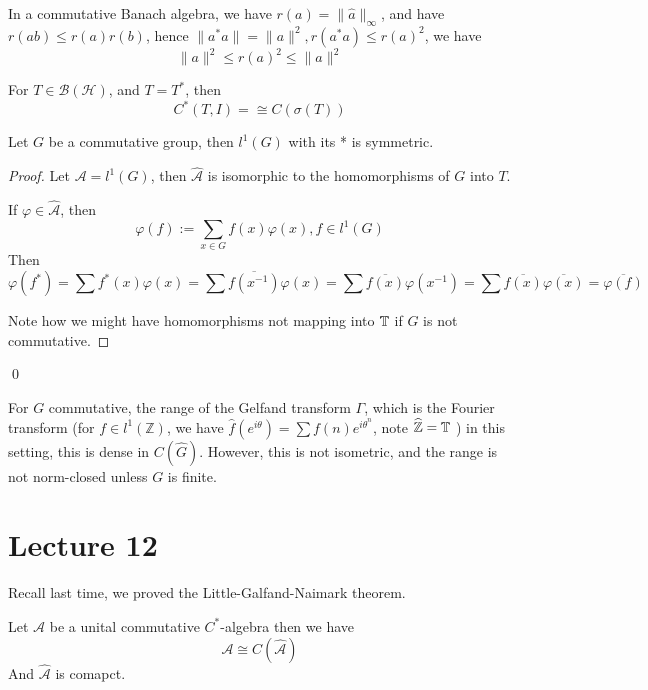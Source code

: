 \begin{remark}
    In a commutative Banach algebra, we have $r(a)=\|\widehat{a}\|_\infty$, and have $r(ab)\leq r(a)r(b)$, hence $\|a^*a\|=\|a\|^2, r(a^*a)\leq r(a)^2$, we have
    \begin{equation*}
        \|a\|^2\leq r(a)^2\leq \|a\|^2
    \end{equation*}
\end{remark}

For $T\in\mathcal{B}(\mathcal{H})$, and $T=T^*$, then
\begin{equation*}
    C^*(T,I)=\cong C(\sigma(T))
\end{equation*}

\begin{proposition}
    Let $G$ be a commutative group, then $l^1(G)$ with its * is symmetric.
\end{proposition}
\begin{proof}
    Let $\mathcal{A}=l^1(G)$, then $\widehat{\mathcal{A}}$ is isomorphic to the homomorphisms of $G$ into $T$.

    If $\varphi\in\widehat{\mathcal{A}}$, then
    \begin{equation*}
        \varphi(f):=\sum_{x\in G} f(x)\varphi(x), f\in l^1(G)
    \end{equation*}
    Then \begin{equation*}
        \varphi(f^*)=\sum f^*(x)\varphi(x)=\sum\overline{f(x^{-1})}\varphi(x)=\sum\overline{f(x)}\varphi(x^{-1})=\sum\overline{f(x)}\overline{\varphi(x)}=\overline{\varphi(f)}
    \end{equation*}

    Note how we might have homomorphisms not mapping into $\mathbb{T}$ if $G$ is not commutative.
\end{proof}
\qed

\begin{proposition}
    For $G$ commutative, the range of the Gelfand transform $\Gamma$, which is the Fourier transform (for $f\in l^1(\mathbb{Z})$, we have $\widehat{f}(e^{i\theta})=\sum f(n)e^{{i\theta}^n}$, note $\widehat{\mathbb{Z}}=\mathbb{T}$ ) in this setting, this is dense in $C(\widehat{G})$. However, this is not isometric, and the range is not norm-closed unless $G$ is finite.
\end{proposition}


\section{Lecture 12}
Recall last time, we proved the Little-Galfand-Naimark theorem.
\begin{theorem}
    Let $\mathcal{A}$ be a unital commutative $C^*$-algebra then we have
    \begin{equation*}
        \mathcal{A}\cong C(\widehat{\mathcal{A}})
    \end{equation*}
    And $\widehat{\mathcal{A}}$ is comapct. 
\end{theorem}

